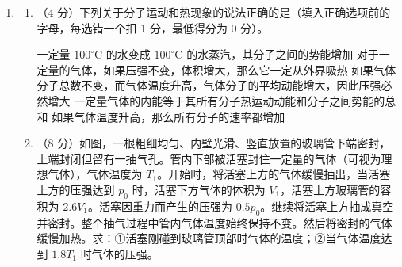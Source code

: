 \documentclass[\gkver]{gaokaozhenti}
\begin{document}
\begin{enumerate}
{
}

\item
\begin{enumerate}
	\item
	（4 分）下列关于分子运动和热现象的说法正确的是（填入正确选项前的字母，每选错一个扣 1 分，最低得分为 0 分）。
	
	{一定量 $100^{\circ}$C 的水变成 $100^{\circ}$C 的水蒸汽，其分子之间的势能增加}
	{对于一定量的气体，如果压强不变，体积增大，那么它一定从外界吸热}
	{如果气体分子总数不变，而气体温度升高，气体分子的平均动能增大，因此压强必然增大}
	{一定量气体的内能等于其所有分子热运动动能和分子之间势能的总和}
	{如果气体温度升高，那么所有分子的速率都增加}
	
	\item
	（8 分）如图，一根粗细均匀、内壁光滑、竖直放置的玻璃管下端密封，上端封闭但留有一抽气孔。管内下部被活塞封住一定量的气体（可视为理想气体），气体温度为 $T_{1}$。开始时，将活塞上方的气体缓慢抽出，当活塞上方的压强达到 $p_{0}$ 时，活塞下方气体的体积为 $V_{1}$，活塞上方玻璃管的容积为 $2.6V_{1}$。活塞因重力而产生的压强为 $0.5p_{0}$。继续将活塞上方抽成真空并密封。整个抽气过程中管内气体温度始终保持不变。然后将密封的气体缓慢加热。求：①活塞刚碰到玻璃管顶部时气体的温度；②当气体温度达到 $1.8T_{1}$ 时气体的压强。
\end{enumerate}





\end{enumerate}
\end{document}
